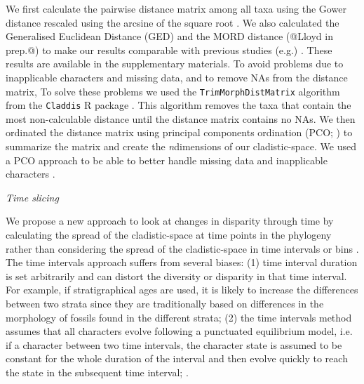 \documentclass[12pt,letterpaper]{article}
\renewcommand{\subsection}[1]{%
\bigskip
\begin{center}
\begin{large}
\normalfont\itshape #1
\end{large}
\end{center}}
\begin{document}
We first calculate the pairwise distance matrix among all taxa using the Gower distance \citep{Gower71} rescaled using the arcsine of the square root \citep{Claddis}. 
We also calculated the Generalised Euclidean Distance (GED) \cite{Wills2001} and the MORD distance (@Lloyd in prep.@) to make our results comparable with previous studies (e.g.) 
. These results are available in the supplementary materials. %
To avoid problems due to inapplicable characters and missing data, and to remove NAs from the distance matrix,
To solve these problems we used the \texttt{TrimMorphDistMatrix} algorithm
from the \texttt{Claddis} R package \citep{Claddis}. This algorithm 
removes the taxa that contain the most non-calculable distance until the distance matrix contains no NAs. 
We then ordinated the distance matrix using principal components ordination
(PCO; \citealt{GOWER01121966}) to summarize the matrix and create the \textit{n}dimensions of our cladistic-space. We used a PCO approach to be able to better handle missing data and inapplicable characters \cite{lofgren2003,Wesley-Hunt2005}.

\subsection{Time slicing} %
We propose a new approach to look at changes in disparity
through time by calculating the spread of the cladistic-space at time points in the phylogeny rather than considering the spread of the cladistic-space in time intervals or bins \citep[e.g.][]{Brusatte12092008,brusattedinosaur2012,toljagictriassic-jurassic2013}. The time intervals approach suffers from several biases: (1) time interval duration is set arbitrarily and can distort the diversity or disparity in that time interval. For example, if stratigraphical ages are used, it is likely to increase the differences between two strata since they are traditionally based on differences in the morphology of fossils found in the different strata; (2) the time intervals method assumes that all characters evolve following a punctuated equilibrium model, i.e. if a character 
between two time intervals, the character state is assumed to be constant for the whole duration of the interval and then evolve quickly to reach the state in the subsequent time interval; \citealt{Gould1977}. %
\end{document}
